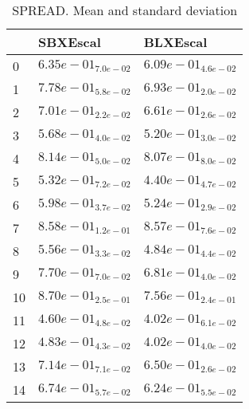 \documentclass{article}
\begin{document}
\begin{table}
\caption{SPREAD. Mean and standard deviation}
\label{table:mean.SPREAD}
\centering
\begin{scriptsize}
\begin{tabular}{lll}
\hline & SBXEscal &  BLXEscal\\
\hline
0 & \cellcolor{gray25}$  6.35e-01_{ 7.0e-02}$ & \cellcolor{gray95}$  6.09e-01_{ 4.6e-02}$ \\
1 & \cellcolor{gray25}$  7.78e-01_{ 5.8e-02}$ & \cellcolor{gray95}$  6.93e-01_{ 2.0e-02}$ \\
2 & \cellcolor{gray25}$  7.01e-01_{ 2.2e-02}$ & \cellcolor{gray95}$  6.61e-01_{ 2.6e-02}$ \\
3 & \cellcolor{gray25}$  5.68e-01_{ 4.0e-02}$ & \cellcolor{gray95}$  5.20e-01_{ 3.0e-02}$ \\
4 & \cellcolor{gray25}$  8.14e-01_{ 5.0e-02}$ & \cellcolor{gray95}$  8.07e-01_{ 8.0e-02}$ \\
5 & \cellcolor{gray25}$  5.32e-01_{ 7.2e-02}$ & \cellcolor{gray95}$  4.40e-01_{ 4.7e-02}$ \\
6 & \cellcolor{gray25}$  5.98e-01_{ 3.7e-02}$ & \cellcolor{gray95}$  5.24e-01_{ 2.9e-02}$ \\
7 & \cellcolor{gray25}$  8.58e-01_{ 1.2e-01}$ & \cellcolor{gray95}$  8.57e-01_{ 7.6e-02}$ \\
8 & \cellcolor{gray25}$  5.56e-01_{ 3.3e-02}$ & \cellcolor{gray95}$  4.84e-01_{ 4.4e-02}$ \\
9 & \cellcolor{gray25}$  7.70e-01_{ 7.0e-02}$ & \cellcolor{gray95}$  6.81e-01_{ 4.0e-02}$ \\
10 & \cellcolor{gray25}$  8.70e-01_{ 2.5e-01}$ & \cellcolor{gray95}$  7.56e-01_{ 2.4e-01}$ \\
11 & \cellcolor{gray25}$  4.60e-01_{ 4.8e-02}$ & \cellcolor{gray95}$  4.02e-01_{ 6.1e-02}$ \\
12 & \cellcolor{gray25}$  4.83e-01_{ 4.3e-02}$ & \cellcolor{gray95}$  4.02e-01_{ 4.0e-02}$ \\
13 & \cellcolor{gray25}$  7.14e-01_{ 7.1e-02}$ & \cellcolor{gray95}$  6.50e-01_{ 2.6e-02}$ \\
14 & \cellcolor{gray25}$  6.74e-01_{ 5.7e-02}$ & \cellcolor{gray95}$  6.24e-01_{ 5.5e-02}$ \\
\hline
\end{tabular}
\end{scriptsize}
\end{table}
\
\end{document}
